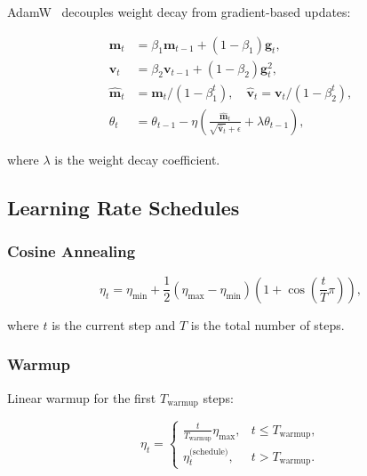 \documentclass[12pt]{report}
\theoremstyle{definition}
\begin{document}
AdamW~\citep{loshchilov2017decoupled} decouples weight decay from gradient-based updates:

\begin{align}
\mathbf{m}_t &= \beta_1 \mathbf{m}_{t-1} + (1 - \beta_1) \mathbf{g}_t, \label{eq:adamw_m} \\
\mathbf{v}_t &= \beta_2 \mathbf{v}_{t-1} + (1 - \beta_2) \mathbf{g}_t^2, \label{eq:adamw_v} \\
\hat{\mathbf{m}}_t &= \mathbf{m}_t / (1 - \beta_1^t), \quad \hat{\mathbf{v}}_t = \mathbf{v}_t / (1 - \beta_2^t), \label{eq:adamw_bias_correct} \\
\theta_t &= \theta_{t-1} - \eta \left(\frac{\hat{\mathbf{m}}_t}{\sqrt{\hat{\mathbf{v}}_t} + \epsilon} + \lambda \theta_{t-1}\right), \label{eq:adamw_update}
\end{align}

where $\lambda$ is the weight decay coefficient.

\subsection{Learning Rate Schedules}

\subsubsection{Cosine Annealing}

\begin{equation}
\eta_t = \eta_{\min} + \frac{1}{2}(\eta_{\max} - \eta_{\min})\left(1 + \cos\left(\frac{t}{T}\pi\right)\right),
\label{eq:cosine_schedule}
\end{equation}

where $t$ is the current step and $T$ is the total number of steps.

\subsubsection{Warmup}

Linear warmup for the first $T_{\text{warmup}}$ steps:

\begin{equation}
\eta_t = \begin{cases}
\frac{t}{T_{\text{warmup}}} \eta_{\max}, & t \leq T_{\text{warmup}}, \\
\eta_t^{\text{(schedule)}}, & t > T_{\text{warmup}}.
\end{cases}
\label{eq:warmup}
\end{equation}
\end{document}
